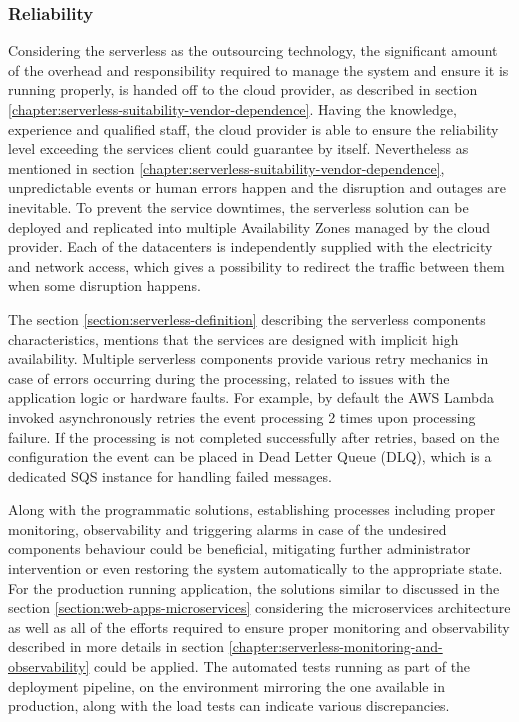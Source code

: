 
\subsubsection{Reliability} \label{chapter:serverless-suitability-reliability}

Considering the serverless as the outsourcing technology, the significant amount of the overhead and responsibility required to manage the system and ensure it is running properly, is handed off to the cloud provider, as described in section \ref{chapter:serverless-suitability-vendor-dependence}. Having the knowledge, experience and qualified staff, the cloud provider is able to ensure the reliability level exceeding the services client could guarantee by itself. Nevertheless as mentioned in section \ref{chapter:serverless-suitability-vendor-dependence}, unpredictable events or human errors happen and the disruption and outages are inevitable. To prevent the service downtimes, the serverless solution can be deployed and replicated into multiple Availability Zones managed by the cloud provider. Each of the datacenters is independently supplied with the electricity and network access, which gives a possibility to redirect the traffic between them when some disruption happens.

The section \ref{section:serverless-definition} describing the serverless components characteristics, mentions that the services are designed with implicit high availability. Multiple serverless components provide various retry mechanics in case of errors occurring during the processing, related to issues with the application logic or hardware faults. For example, by default the AWS Lambda invoked asynchronously retries the event processing 2 times upon processing failure. If the processing is not completed successfully after retries, based on the configuration the event can be placed in Dead Letter Queue (DLQ), which is a dedicated SQS instance for handling failed messages.

Along with the programmatic solutions, establishing processes including proper monitoring, observability and triggering alarms in case of the undesired components behaviour could be beneficial, mitigating further administrator intervention or even restoring the system automatically to the appropriate state.
For the production running application, the solutions similar to discussed in the section \ref{section:web-apps-microservices} considering the microservices architecture as well as all of the efforts required to ensure proper monitoring and observability described in more details in section \ref{chapter:serverless-monitoring-and-observability} could be applied.
The automated tests running as part of the deployment pipeline, on the environment mirroring the one available in production, along with the load tests can indicate various discrepancies.

